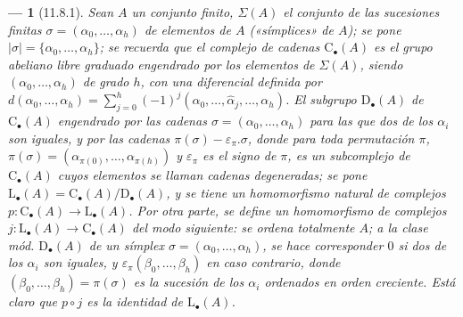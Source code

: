 \documentclass[10pt,oneside,openany]{book}
\theoremstyle{egaenv}\newtheorem*{env}{---}
\theoremstyle{egastatement}
\theoremstyle{egadescription}
\begin{document}
\begin{env}[11.8.1]
\label{0.11.8.1-fr}
Sean $A$ un conjunto finito, $\Sigma(A)$ el conjunto de las sucesiones finitas $\sigma=(\alpha_0,\ldots,\alpha_h)$ de elementos de $A$ («símplices» de $A$); se pone $|\sigma|=\{\alpha_0,\ldots,\alpha_h\}$; se recuerda que el complejo de cadenas $\mathrm C_\bullet(A)$ es el grupo abeliano libre graduado engendrado por los elementos de $\Sigma(A)$, siendo $(\alpha_0,\ldots,\alpha_h)$ de \emph{grado} $h$, con una diferencial definida por $d(\alpha_0,\ldots,\alpha_h)=\sum_{j=0}^{h}(-1)^j(\alpha_0,\ldots,\widehat{\alpha}_j,\ldots,\alpha_h)$. El subgrupo $\mathrm D_\bullet(A)$ de $\mathrm C_\bullet(A)$ engendrado por las cadenas $\sigma=(\alpha_0,\ldots,\alpha_h)$ para las que dos de los $\alpha_i$ son iguales, y por las cadenas $\pi(\sigma)-\varepsilon_\pi.\sigma$, donde para toda permutación $\pi$, $\pi(\sigma)=(\alpha_{\pi(0)},\ldots,\alpha_{\pi(h)})$ y $\varepsilon_\pi$ es el signo de $\pi$, es un subcomplejo de $\mathrm C_\bullet(A)$ cuyos elementos se llaman cadenas \emph{degeneradas}; se pone $\mathrm L_\bullet(A)=\mathrm C_\bullet(A)/\mathrm D_\bullet(A)$, y se tiene un homomorfismo natural de complejos $p:\mathrm C_\bullet(A)\longrightarrow\mathrm L_\bullet(A)$. Por otra parte, se define un homomorfismo de complejos $j:\mathrm L_\bullet(A)\longrightarrow\mathrm C_\bullet(A)$ del modo siguiente: se ordena totalmente $A$; a la clase mód. $\mathrm D_\bullet(A)$ de un símplex $\sigma=(\alpha_0,\ldots,\alpha_h)$, se hace corresponder $0$ si dos de los $\alpha_i$ son iguales, y $\varepsilon_\pi(\beta_0,\ldots,\beta_h)$ en caso contrario, donde $(\beta_0,\ldots,\beta_h)=\pi(\sigma)$ es la sucesión de los $\alpha_i$ ordenados \emph{en orden creciente}. Está claro que $p\circ
j$ es la \emph{identidad} de $\mathrm L_\bullet(A)$.
\end{env}
\end{document}
